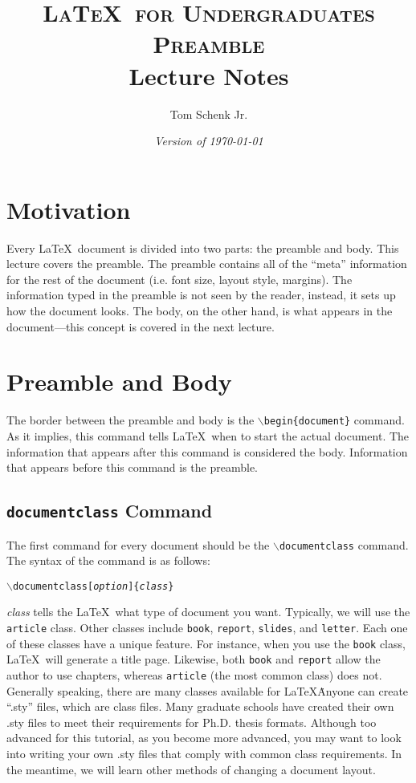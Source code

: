 \documentclass{article}
\title{\textsc{\LaTeX\ for Undergraduates\\
			Preamble} \\
			Lecture Notes}
\author{Tom Schenk Jr.}		%
\date{\textit{Version of \today}}
\begin{document}
\maketitle

\section{Motivation}

Every \LaTeX\ document is divided into two parts: the preamble and body. This lecture covers the preamble. The preamble contains all of the ``meta'' information for the rest of the document (i.e. font size, layout style, margins). The information typed in the preamble is not seen by the reader, instead, it sets up how the document looks. The body, on the other hand, is what appears in the document---this concept is covered in the next lecture.

\section{Preamble and Body}

The border between the preamble and body is the \texttt{$\backslash$begin\{document\}} command. As it implies, this command tells \LaTeX\ when to start the actual document. The information that appears after this command is considered the body. Information that appears before this command is the preamble.

\subsection{\texttt{documentclass} Command}

The first command for every document should be the \texttt{$\backslash$documentclass} command. The syntax of the command is as follows:
\begin{center}
	\texttt{$\backslash$documentclass[\textit{option}]\{\textit{class}\}}
\end{center}
\textit{class} tells the \LaTeX\ what type of document you want. Typically, we will use the \texttt{article} class. Other classes include \texttt{book}, \texttt{report}, \texttt{slides}, and \texttt{letter}. Each one of these classes have a unique feature. For instance, when you use the \texttt{book} class, \LaTeX\ will generate a title page. Likewise, both \texttt{book} and \texttt{report} allow the author to use chapters, whereas \texttt{article} (the most common class) does not. Generally speaking, there are many classes available for \LaTeX\. Anyone can create ``.sty'' files, which are class files. Many graduate schools have created their own .sty files to meet their requirements for Ph.D. thesis formats. Although too advanced for this tutorial, as you become more advanced, you may want to look into writing your own .sty files that comply with common class requirements. In the meantime, we will learn other methods of changing a document layout.
\end{document}
